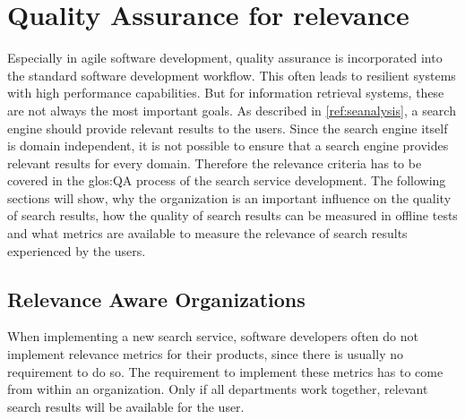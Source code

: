 \chapter{Quality Assurance for relevance}
\label{ref:qa}

Especially in agile software development, quality assurance is incorporated into the standard software development workflow.
This often leads to resilient systems with high performance capabilities.
But for information retrieval systems, these are not always the most important goals.
As described in \autoref{ref:seanalysis}, a search engine should provide relevant results to the users.
Since the search engine itself is domain independent, 
it is not possible to ensure that a search engine provides relevant results for every domain.
Therefore the relevance criteria has to be covered in the \gls{glos:QA} process of the search service development.
The following sections will show, why the organization is an important influence on the quality of search results,
how the quality of search results can be measured in offline tests 
and what metrics are available to measure the relevance of search results experienced by the users.


\section{Relevance Aware Organizations}
\label{ref:qa:orga}
When implementing a new search service, software developers often
do not implement relevance metrics for their products,
since there is usually no requirement to do so.
The requirement to implement these metrics has to come from within an organization.
Only if all departments work together, relevant search results will be available for the user.
\par

